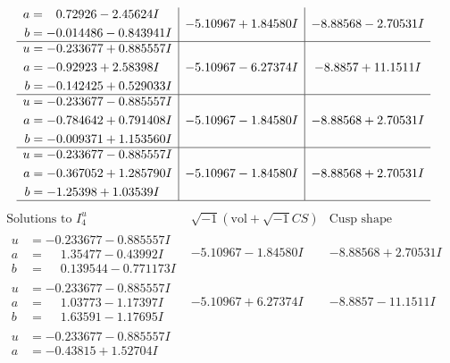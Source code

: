 \documentclass[1p]{elsarticle_modified}
\theoremstyle{definition}
\newcommand{\I}{\sqrt{-1}}
\begin{document}
$$\begin{array}{c|c|c}
\begin{aligned}
a &= \phantom{-}0.72926 - 2.45624 I \\
b &= -0.014486 - 0.843941 I\end{aligned}
 & -5.10967 + 1.84580 I & -8.88568 - 2.70531 I \\ \hline\begin{aligned}
u &= -0.233677 + 0.885557 I \\
a &= -0.92923 + 2.58398 I \\
b &= -0.142425 + 0.529033 I\end{aligned}
 & -5.10967 - 6.27374 I & -8.8857 + 11.1511 I \\ \hline\begin{aligned}
u &= -0.233677 - 0.885557 I \\
a &= -0.784642 + 0.791408 I \\
b &= -0.009371 + 1.153560 I\end{aligned}
 & -5.10967 - 1.84580 I & -8.88568 + 2.70531 I \\ \hline\begin{aligned}
u &= -0.233677 - 0.885557 I \\
a &= -0.367052 + 1.285790 I \\
b &= -1.25398 + 1.03539 I\end{aligned}
 & -5.10967 - 1.84580 I & -8.88568 + 2.70531 I\\
 \hline 
 \end{array}$$\newpage$$\begin{array}{c|c|c}  
\text{Solutions to }I^u_{4}& \I (\text{vol} + \sqrt{-1}CS) & \text{Cusp shape}\\
 \hline 
\begin{aligned}
u &= -0.233677 - 0.885557 I \\
a &= \phantom{-}1.35477 - 0.43992 I \\
b &= \phantom{-}0.139544 - 0.771173 I\end{aligned}
 & -5.10967 - 1.84580 I & -8.88568 + 2.70531 I \\ \hline\begin{aligned}
u &= -0.233677 - 0.885557 I \\
a &= \phantom{-}1.03773 - 1.17397 I \\
b &= \phantom{-}1.63591 - 1.17695 I\end{aligned}
 & -5.10967 + 6.27374 I & -8.8857 - 11.1511 I \\ \hline\begin{aligned}
u &= -0.233677 - 0.885557 I \\
a &= -0.43815 + 1.52704 I \\

\end{aligned}
\end{array}$$
\end{document}
